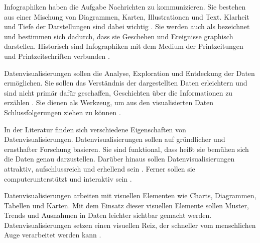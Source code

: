 Infographiken haben die Aufgabe Nachrichten zu kommunizieren.
Sie bestehen aus einer Mischung von Diagrammen, Karten, Illustrationen und Text. Klarheit und Tiefe der Darstellungen sind dabei wichtig
\cite[Vgl.][31]{cairo_truthful_2016}. Sie werden auch als 
bezeichnet und bestimmen sich dadurch, dass sie Geschehen und Ereignisse graphisch darstellen. 
Historisch sind Infographiken mit dem Medium der Printzeitungen und Printzeitschriften verbunden \cite[Vgl.][27]{kirk_data_2019}.

Datenvisualisierungen sollen die Analyse, Exploration und Entdeckung der Daten ermöglichen. Sie sollen das Verständnis der dargestellten Daten erleichtern
und sind nicht primär dafür geschaffen, Geschichten über die Informationen zu erzählen \cite[Vgl.][20 ff.]{kirk_data_2019}. 
Sie dienen als Werkzeug, um aus den visualisierten Daten Schlussfolgerungen ziehen zu können \cite[Vgl.][31]{cairo_truthful_2016}. %

In der Literatur finden sich verschiedene Eigenschaften von Datenvisualisierungen.
Datenvisualisierungen sollen auf gründlicher und ernsthafter Forschung basieren. Sie sind funktional, dass heißt
sie bemühen sich die Daten genau darzustellen. Darüber hinaus sollen Datenvisualisierungen attraktiv, 
aufschlussreich und erhellend sein \cite[Vgl.][45]{cairo_truthful_2016}. 
Ferner sollen sie computerunterstützt und interaktiv sein \cite[Vgl.][12]{few_now_2009}.


Datenvisualisierungen arbeiten mit visuellen Elementen wie Charts, Diagrammen, Tabellen und Karten.
Mit dem Einsatz dieser visuellen Elemente sollen Muster, Trends und Ausnahmen in Daten leichter sichtbar gemacht werden.
Datenvisualisierungen setzen einen visuellen Reiz, der schneller vom menschlichen Auge verarbeitet werden kann \cite[Vgl.][32]{few_now_2009}.


